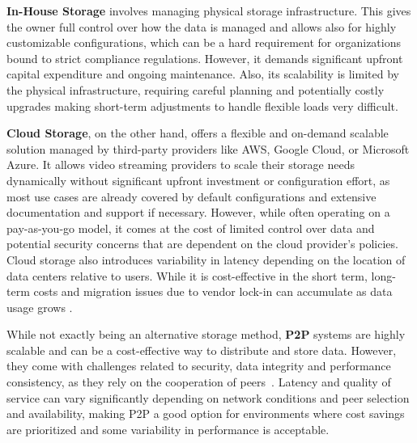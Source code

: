 \textbf{In-House Storage} involves managing physical storage infrastructure. This gives the owner full control over how the data is managed and allows also for highly customizable configurations, which can be a hard requirement for organizations bound to strict compliance regulations. However, it demands significant upfront capital expenditure and ongoing maintenance. Also, its scalability is limited by the physical infrastructure, requiring careful planning and potentially costly upgrades making short-term adjustments to handle flexible loads very difficult. 

\textbf{Cloud Storage}, on the other hand, offers a flexible and on-demand scalable solution managed by third-party providers like AWS, Google Cloud, or Microsoft Azure. It allows video streaming providers to scale their storage needs dynamically without significant upfront investment or configuration effort, as most use cases are already covered by default configurations and extensive documentation and support if necessary. However, while often operating on a pay-as-you-go model, it comes at the cost of limited control over data and potential security concerns that are dependent on the cloud provider's policies. Cloud storage also introduces variability in latency depending on the location of data centers relative to users. While it is cost-effective in the short term, long-term costs and migration issues due to vendor lock-in can accumulate as data usage grows \parencite{cloud_streaming_cost}.

While not exactly being an alternative storage method, \textbf{\ac{P2P}} systems are highly scalable and can be a cost-effective way to distribute and store data. However, they come with challenges related to security, data integrity and performance consistency, as they rely on the cooperation of peers~\parencite{p2p}. Latency and quality of service can vary significantly depending on network conditions and peer selection and availability, making \ac{P2P} a good option for environments where cost savings are prioritized and some variability in performance is acceptable.

